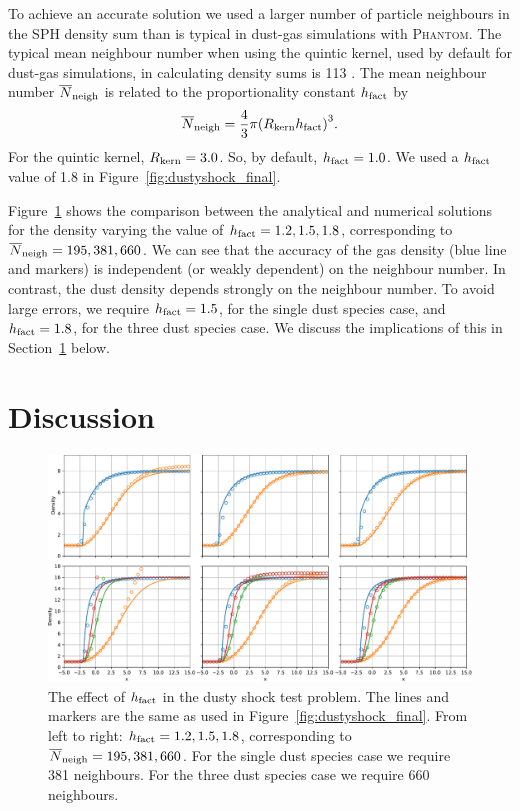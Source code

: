 \documentclass[fleqn,usenatbib]{mnras}
\begin{document}
To achieve an accurate solution we used a larger number of particle neighbours
in the SPH density sum than is typical in dust-gas simulations with
\textsc{Phantom}. The typical mean neighbour number when using the quintic
kernel, used by default for dust-gas simulations, in calculating density sums is
113 \citep{Price2018PASA...35...31P}. The mean neighbour number
\(\overline{N}_{\rm neigh}\) is related to the proportionality constant \(h_{\rm
fact}\) by
%
\begin{align}
   \overline{N}_{\rm neigh} = \frac{4}{3} \pi
      {\left( R_{\rm kern} h_{\rm fact} \right)}^3.
\end{align}
%
For the quintic kernel, \( R_{\rm kern} = 3.0 \). So, by default, \( h_{\rm
fact} = 1.0 \). We used a \(h_{\rm fact}\) value of 1.8 in
Figure~\ref{fig:dustyshock_final}.

Figure~\ref{fig:dustyshock_hfact} shows the comparison between the analytical
and numerical solutions for the density varying the value of \( h_{\rm fact} =
1.2, 1.5, 1.8 \), corresponding to \(\overline{N}_{\rm neigh} = 195, 381, 660\).
We can see that the accuracy of the gas density (blue line and markers) is
independent (or weakly dependent) on the neighbour number. In contrast, the dust
density depends strongly on the neighbour number. To avoid large errors, we
require \( h_{\rm fact} = 1.5\), for the single dust species case, and \(h_{\rm
fact} = 1.8\), for the three dust species case. We discuss the implications of
this in Section~\ref{sec:discussion} below.


\section{Discussion}%
\label{sec:discussion}

\begin{figure}
   \begin{center}
      \includegraphics[width=\textwidth]{figs/dustyshock_hfact.pdf}
      \caption{The effect of \(h_{\rm fact}\) in the dusty shock test problem.
         The lines and markers are the same as used in
         Figure~\ref{fig:dustyshock_final}. From left to right: \(h_{\rm fact} =
         1.2, 1.5, 1.8\), corresponding to \(\overline{N}_{\rm neigh} = 195,
         381, 660\). For the single dust species case we require 381 neighbours.
         For the three dust species case we require 660 neighbours.%
         \label{fig:dustyshock_hfact}}
   \end{center}
\end{figure}
\end{document}
